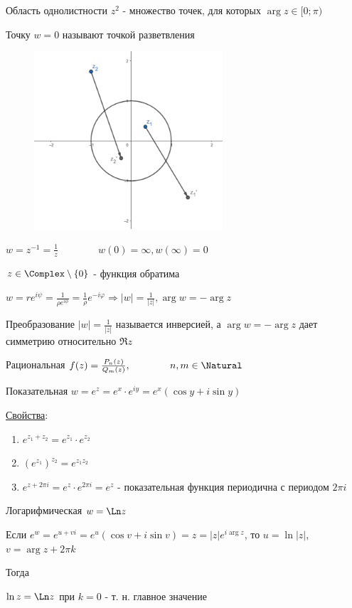 Область однолистности $z^2$ - множество точек, для которых $\arg z \in [0; \pi)$

Точку $w = 0$ называют точкой разветвления


\begin{figure}
    \includegraphics[width=7cm]{addchapters2/images/addchapters2_2025_02_21_1}
\end{figure}

\Exs $w = z^{-1} = \frac{1}{z} \qquad\qquad w(0) = \infty, w(\infty) = 0$

$z \in \Complex \setminus \{0\}$ - функция обратима

$w = re^{i\psi} = \frac{1}{\rho e^{i\phi}} = \frac{1}{\rho} e^{-i\varphi} \Longrightarrow |w| = \frac{1}{|z|}, \arg w = -\arg z$

Преобразование $|w| = \frac{1}{|z|}$ называется инверсией, а $\arg w = -\arg z$ дает симметрию относительно $\Re z$

 Рациональная $f(z) = \frac{P_n(z)}{Q_m(z)}, \qquad\qquad n, m \in \Natural$

 Показательная $w = e^z = e^x \cdot e^{iy} = e^x (\cos y + i \sin y)$

\underline{Свойства}: 

\begin{enumerate}
    \item $e^{z_1 + z_2} = e^{z_1} \cdot e^{z_2}$
    \item $\left(e^{z_1}\right)^{z_2} = e^{z_1 z_2}$
    \item $e^{z + 2\pi i} = e^{z} \cdot e^{2\pi i} = e^z$ - показательная функция периодична с периодом $2\pi i$
\end{enumerate}

 Логарифмическая $w = \Ln z$

Если $e^w = e^{u + vi} = e^u (\cos v + i \sin v) = z = |z| e^{i\arg z}$, то $u = \ln |z|$, $v = \arg z + 2\pi k$

Тогда 

$\ln z = \Ln z$ при $k = 0$ - т. н. главное значение



